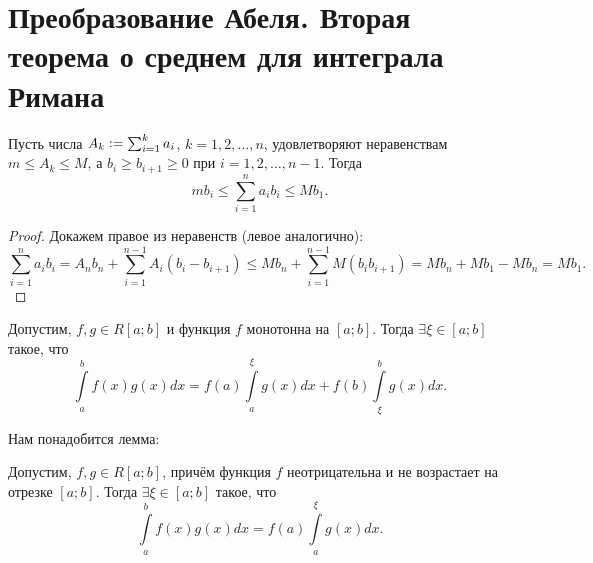 \section{Преобразование Абеля. Вторая теорема о среднем для интеграла Римана}

\begin{lemma}
    Пусть числа $A_k \vcentcolon = \sum_{i = 1}^ka_i$, $k = 1, 2, \ldots, n$, удовлетворяют неравенствам $m \leqslant A_k \leqslant M$, а $b_i \geqslant b_{i + 1} \geqslant 0$ при $i = 1, 2, \ldots, n - 1$. Тогда
    \[
        mb_i \leqslant \sum_{i = 1}^na_ib_i \leqslant Mb_1.
    \]
\end{lemma}

\begin{proof}
    Докажем правое из неравенств (левое аналогично):
    \[
        \sum_{i = 1}^na_ib_i = A_nb_n + \sum_{i = 1}^{n - 1}A_i(b_i - b_{i + 1}) \leqslant Mb_n + \sum_{i = 1}^{n - 1}M(b_i  b_{i + 1}) = Mb_n + Mb_1 - Mb_n = Mb_1.
    \]
\end{proof}

\begin{theorem}
    Допустим, $f, g \in R[a; b]$ и функция $f$ монотонна на $[a; b]$. Тогда $\exists\xi \in [a; b]$ такое, что
    \[
        \int\limits_a^bf(x)g(x)dx = f(a)\int\limits_a^\xi g(x)dx + f(b)\int\limits_\xi^bg(x)dx.
    \]
\end{theorem}

Нам понадобится лемма:

\begin{lemma}
    Допустим, $f, g \in R[a; b]$, причём функция $f$ неотрицательна и не возрастает на отрезке $[a; b]$. Тогда $\exists\xi \in [a; b]$ такое, что
    \[
        \int\limits_a^bf(x)g(x)dx = f(a)\int\limits_a^\xi g(x)dx.
    \]
\end{lemma}

